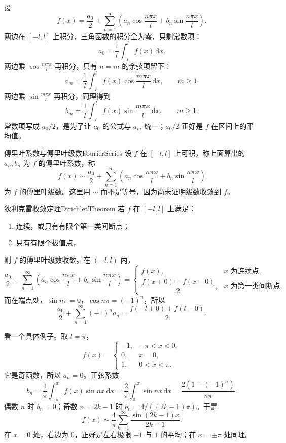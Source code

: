 设
\[
f(x)=\frac{a_0}{2}+\sum_{n=1}^{\infty}
\left(a_n\cos\frac{n\pi x}{l}+b_n\sin\frac{n\pi x}{l}\right).
\]
两边在 $[-l,l]$ 上积分，三角函数的积分全为零，只剩常数项：
\[
a_0=\frac1l\int_{-l}^{l}f(x)\,\mathrm dx.
\]
两边乘 $\cos\frac{m\pi x}{l}$ 再积分，只有 $n=m$ 的余弦项留下：
\[
a_m=\frac1l\int_{-l}^{l}f(x)\cos\frac{m\pi x}{l}\,\mathrm dx,
\qquad m\ge1.
\]
两边乘 $\sin\frac{m\pi x}{l}$ 再积分，同理得到
\[
b_m=\frac1l\int_{-l}^{l}f(x)\sin\frac{m\pi x}{l}\,\mathrm dx,
\qquad m\ge1.
\]
常数项写成 $a_0/2$，是为了让 $a_0$ 的公式与 $a_m$ 统一；$a_0/2$ 正好是 $f$ 在区间上的平均值。

\begin{mydef}{傅里叶系数与傅里叶级数}{FourierSeries}
    设 $f$ 在 $[-l,l]$ 上可积，称上面算出的 $a_n,b_n$ 为 $f$ 的傅里叶系数，称
    \[
        f(x)\sim\frac{a_0}{2}+\sum_{n=1}^{\infty}
        \left(a_n\cos\frac{n\pi x}{l}+b_n\sin\frac{n\pi x}{l}\right)
    \]
    为 $f$ 的傅里叶级数。这里用 $\sim$ 而不是等号，因为尚未证明级数收敛到 $f$。
\end{mydef}

\begin{conclusion}{狄利克雷收敛定理}{DirichletTheorem}
    若 $f$ 在 $[-l,l]$ 上满足：
    \begin{enumerate}
        \item 连续，或只有有限个第一类间断点；
        \item 只有有限个极值点，
    \end{enumerate}
    则 $f$ 的傅里叶级数收敛。在 $(-l,l)$ 内，
    \[
        \frac{a_0}{2}+\sum_{n=1}^{\infty}
        \left(a_n\cos\frac{n\pi x}{l}+b_n\sin\frac{n\pi x}{l}\right)
        =
        \begin{cases}
        f(x),&x\text{ 为连续点},\\[4pt]
        \dfrac{f(x+0)+f(x-0)}{2},&x\text{ 为第一类间断点},
        \end{cases}
    \]
    而在端点处，$\sin n\pi=0$，$\cos n\pi=(-1)^n$，所以
    \[
        \frac{a_0}{2}+\sum_{n=1}^{\infty}(-1)^n a_n
        =\frac{f(-l+0)+f(l-0)}{2}.
    \]
\end{conclusion}

看一个具体例子。取 $l=\pi$，
\[
f(x)=
\begin{cases}
-1,&-\pi<x<0,\\
0,&x=0,\\
1,&0<x<\pi.
\end{cases}
\]
它是奇函数，所以 $a_n=0$。正弦系数
\[
b_n=\frac1\pi\int_{-\pi}^{\pi}f(x)\sin nx\,\mathrm dx
=\frac2\pi\int_0^{\pi}\sin nx\,\mathrm dx
=\frac{2(1-(-1)^n)}{n\pi}.
\]
偶数 $n$ 时 $b_n=0$；奇数 $n=2k-1$ 时 $b_n=4/((2k-1)\pi)$。于是
\[
f(x)\sim\frac4\pi\sum_{k=1}^{\infty}\frac{\sin(2k-1)x}{2k-1}.
\]
在 $x=0$ 处，右边为 $0$，正好是左右极限 $-1$ 与 $1$ 的平均；在 $x=\pm\pi$ 处同理。

